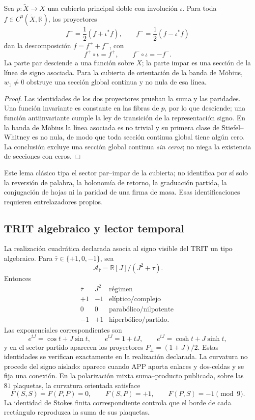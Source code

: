\begin{theorem}
\label{pf84:A10-md-mobius}
Sea \(p:\widetilde X\to X\) una cubierta principal doble con involuci\'on
\(\iota\). Para toda \(f\in C^0(\widetilde X,\mathbb R)\), los proyectores
\[
 f^+=\frac12(f+\iota^*f),\qquad
 f^-=\frac12(f-\iota^*f)
\]
dan la descomposici\'on \(f=f^++f^-\), con
\[
 f^+\circ\iota=f^+,\qquad f^-\circ\iota=-f^-.
\]
La parte par desciende a una funci\'on sobre \(X\); la parte impar es una
secci\'on de la l\'inea de signo asociada. Para la cubierta de orientaci\'on
de la banda de M\"obius, \(w_1\ne0\) obstruye una secci\'on global continua
y no nula de esa l\'inea.
\end{theorem}

\begin{proof}
Las identidades de los dos proyectores prueban la suma y las paridades. Una
funci\'on invariante es constante en las fibras de \(p\), por lo que
desciende; una funci\'on antiinvariante cumple la ley de transici\'on de la
representaci\'on signo. En la banda de M\"obius la l\'inea asociada es no
trivial y su primera clase de Stiefel--Whitney es no nula, de modo que toda
secci\'on continua global tiene alg\'un cero. La conclusi\'on excluye una
secci\'on global continua \emph{sin ceros}; no niega la existencia de
secciones con ceros.
\end{proof}

Este lema cl\'asico tipa el sector par--impar de la cubierta; no identifica
por s\'i solo la reversi\'on de palabra, la holonom\'ia de retorno, la
graduaci\'on partida, la conjugaci\'on de hojas ni la paridad de una firma de
masa. Esas identificaciones requieren entrelazadores propios.

\subsection{TRIT algebraico y lector temporal}

La realizaci\'on cuadr\'atica declarada asocia al signo visible del TRIT un tipo
algebraico. Para
\(\bar\tau\in\{+1,0,-1\}\), sea
\[
 \mathcal A_{\bar\tau}=
 \mathbb R[J]/(J^2+\bar\tau).
\]
Entonces
\[
 \begin{array}{c|c|c}
 \bar\tau&J^2&\text{r\'egimen}\ \\ \hline
 +1&-1&\text{el\'iptico/complejo}\ \\
 0&0&\text{parab\'olico/nilpotente}\ \\
 -1&+1&\text{hiperb\'olico/partido}.
 \end{array}
\]
Las exponenciales correspondientes son
\[
 e^{tJ}=\cos t+J\sin t,
 \qquad e^{tJ}=1+tJ,
 \qquad e^{tJ}=\cosh t+J\sinh t,
\]
y en el sector partido aparecen los proyectores
\(P_\pm=(1\pm J)/2\). Estas identidades se verifican exactamente en la
realizaci\'on declarada. La
curvatura no procede del signo aislado: aparece cuando APP aporta enlaces y
dos-celdas y se fija una conexi\'on. En la polarizaci\'on mixta suma--producto
publicada, sobre las \(81\) plaquetas, la curvatura orientada satisface
\[
 F(S,S)=F(P,P)=0,
 \qquad F(S,P)=+1,
 \qquad F(P,S)=-1\pmod9.
\]
La identidad de Stokes finita correspondiente controla que el borde de cada
rect\'angulo reproduzca la suma de sus plaquetas.

